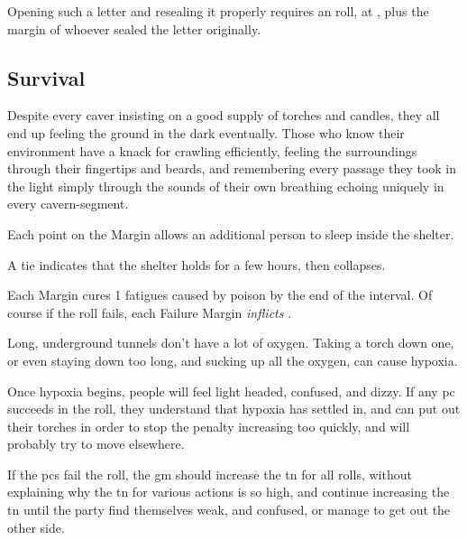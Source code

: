 \begin{multicols}{2}
Opening such a letter and resealing it properly requires an  roll, at \tn[14], plus the margin of whoever sealed the letter originally.

\subsection{Survival}

Despite every caver insisting on a good supply of torches and candles, they all end up feeling the ground in the dark eventually.
Those who know their environment have a knack for crawling efficiently, feeling the surroundings through their fingertips and beards, and remembering every passage they took in the light simply through the sounds of their own breathing echoing uniquely in every cavern-segment.


Each point on the Margin allows an additional person to sleep inside the shelter.

A tie indicates that the shelter holds for a few hours, then collapses.


Each Margin cures 1 \glspl{fatigue} caused by poison by the end of the \gls{interval}.
Of course if the roll fails, each Failure Margin \emph{inflicts} .

Long, underground tunnels don't have a lot of oxygen.
Taking a torch down one, or even staying down too long, and sucking up all the oxygen, can cause hypoxia.

Once hypoxia begins, people will feel light headed, confused, and dizzy.
If any \gls{pc} succeeds in the roll, they understand that hypoxia has settled in, and can put out their torches in order to stop the penalty increasing too quickly, and will probably try to move elsewhere.

If the \glspl{pc} fail the roll, the \gls{gm} should increase the \gls{tn} for all rolls, without explaining why the \gls{tn} for various actions is so high, and continue increasing the \gls{tn} until the party find themselves weak, and confused, or manage to get out the other side.


\end{multicols}
